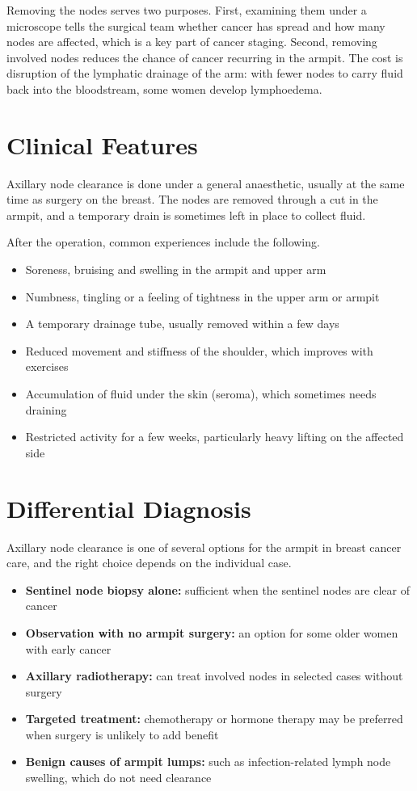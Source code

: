 Removing the nodes serves two purposes. First, examining them under a microscope tells the surgical team whether cancer has spread and how many nodes are affected, which is a key part of cancer staging. Second, removing involved nodes reduces the chance of cancer recurring in the armpit. The cost is disruption of the lymphatic drainage of the arm: with fewer nodes to carry fluid back into the bloodstream, some women develop lymphoedema.

\section*{Clinical Features}
Axillary node clearance is done under a general anaesthetic, usually at the same time as surgery on the breast. The nodes are removed through a cut in the armpit, and a temporary drain is sometimes left in place to collect fluid.

After the operation, common experiences include the following.

\begin{itemize}
    \item Soreness, bruising and swelling in the armpit and upper arm
    \item Numbness, tingling or a feeling of tightness in the upper arm or armpit
    \item A temporary drainage tube, usually removed within a few days
    \item Reduced movement and stiffness of the shoulder, which improves with exercises
    \item Accumulation of fluid under the skin (seroma), which sometimes needs draining
    \item Restricted activity for a few weeks, particularly heavy lifting on the affected side
\end{itemize}

\section*{Differential Diagnosis}
Axillary node clearance is one of several options for the armpit in breast cancer care, and the right choice depends on the individual case.

\begin{itemize}
    \item \textbf{Sentinel node biopsy alone:} sufficient when the sentinel nodes are clear of cancer
    \item \textbf{Observation with no armpit surgery:} an option for some older women with early cancer
    \item \textbf{Axillary radiotherapy:} can treat involved nodes in selected cases without surgery
    \item \textbf{Targeted treatment:} chemotherapy or hormone therapy may be preferred when surgery is unlikely to add benefit
    \item \textbf{Benign causes of armpit lumps:} such as infection-related lymph node swelling, which do not need clearance
\end{itemize}

